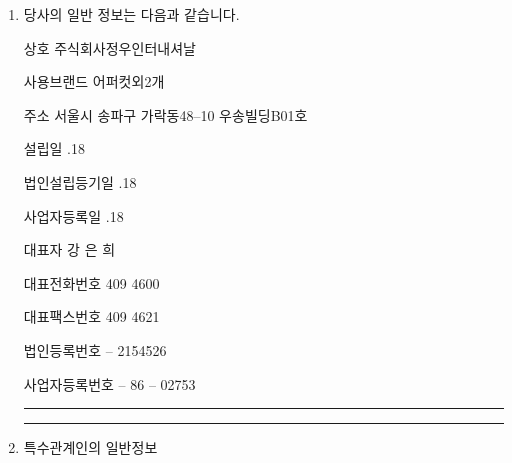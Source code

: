 \documentclass[a5paper,10pt]{oblivoir}
\newcommand\crule[3][black]{\textcolor{#1}{\rule{#2}{#3}}}
\begin{document}
\begin{enumerate}
\item 당사의 일반 정보는 다음과 같습니다.
\begin{Form}
\def\LayoutCheckField#1#2{%
  \parbox[c][5mm]{5mm}{\centering\footnotesize\strut #1\\#2}%
}
\def\LayoutCheckField#1#2{%
  \makebox[0pt][l]{%
    \makebox[5mm][c]{\footnotesize\strut #1}%
  }%
  #2%
}
\def\DefaultHeightofCheckBox{5mm}
\def\DefaultWidthofCheckBox{5mm}


\begin{footnotesize}
 상호
\noindent\dotfill 
 주식회사정우인터내셔날

 사용브랜드
\noindent\dotfill 
어퍼컷외2개

 주소
\noindent\dotfill 
 서울시 송파구 가락동48--10  우송빌딩B01호

 설립일
\noindent{}.18

 법인설립등기일
\noindent{}.18

 사업자등록일
\noindent{}.18

 대표자
\noindent\dotfill 
 강 은 희

 대표전화번호
\noindent{} 409 4600

 대표팩스번호
\noindent{} 409 4621

 법인등록번호
\noindent{} -- 2154526

 사업자등록번호
\noindent{} -- 86 -- 02753

\end{footnotesize}
\end{Form}

\newpage
\begin{center}
\crule[red]{4cm}{0.1cm} \crule[blue]{4cm}{0.1cm}
\end{center}
\item 특수관계인의 일반정보

\begin{footnotesize}
\begin{tabu}{|X[-1]|X|}\hline


\end{tabu}
\end{footnotesize}
\end{enumerate}
\end{document}
